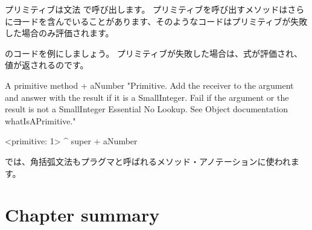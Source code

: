 \documentclass[a4paper,10pt,twoside]{book}
\begin{document}
プリミティブは文法 で呼び出します。
プリミティブを呼び出すメソッドはさらに\st コードを含んでいることがあります、そのようなコードはプリミティブが失敗した場合のみ評価されます。

のコードを例にしましょう。
プリミティブが失敗した場合は、式が評価され、値が返されるのです。

\begin{method}[primitive]{A primitive method}
+ aNumber 
  "Primitive. Add the receiver to the argument and answer with the result
  if it is a SmallInteger. Fail if the argument or the result is not a
  SmallInteger  Essential  No Lookup. See Object documentation whatIsAPrimitive."

  <primitive: 1>
  ^ super + aNumber
\end{method}





\pharo では、角括弧文法もプラグマと呼ばれるメソッド・アノテーションに使われます。

\section{Chapter summary}
\end{document}
